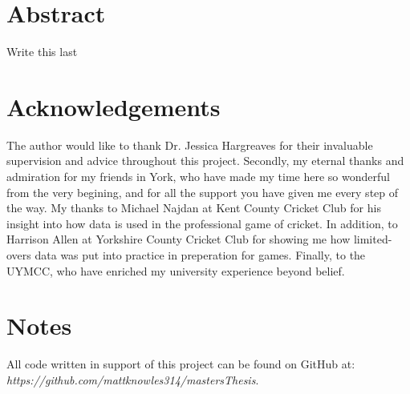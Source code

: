 \documentclass[11pt]{report}
\begin{document}


\section*{Abstract}
Write this last

\section*{Acknowledgements}
The author would like to thank Dr. Jessica Hargreaves for their invaluable supervision and advice throughout this project. Secondly, my eternal thanks and admiration for my friends in York, who have made my time here so wonderful from the very begining, and for all the support you have given me every step of the way. 
My thanks to Michael Najdan at Kent County Cricket Club for his insight into how data is used in the professional game of cricket. In addition, to Harrison Allen at Yorkshire County Cricket Club for showing me how limited-overs data was put into practice in preperation for games.
Finally, to the UYMCC, who have enriched my university experience beyond belief. 


\section*{Notes}
All code written in support of this project can be found on GitHub at: \\
\textit{https://github.com/mattknowles314/mastersThesis}.

\setcounter{tocdepth}{0}
\tableofcontents

\setcounter{tocdepth}{1}
\listoffigures
















{}

\end{document}
